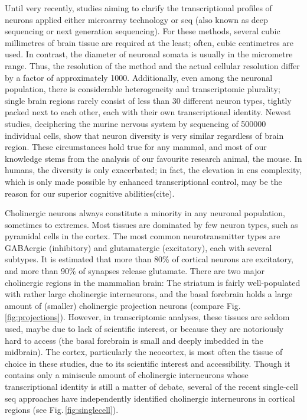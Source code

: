 Until very recently, studies aiming to clarify the transcriptional profiles of neurons applied either microarray technology or \ac{seq} (also known as deep sequencing or next generation sequencing). For these methods, several cubic millimetres of brain tissue are required at the least; often, cubic centimetres are used. In contrast, the diameter of neuronal somata is usually in the micrometre range. Thus, the resolution of the method and the actual cellular resolution differ by a factor of approximately \num{1000}. Additionally, even among the neuronal population, there is considerable heterogeneity and transcriptomic plurality; single brain regions rarely consist of less than 30 different neuron types, tightly packed next to each other, each with their own transcriptional identity.\cite{Darmanis2015, Zeisel2015, Tasic2016, Habib2016} Newest studies, deciphering the murine nervous system by sequencing of \num{500000} individual cells, show that neuron diversity is very similar regardless of brain region.\cite{Zeisel2018} These circumstances hold true for any mammal, and most of our knowledge stems from the analysis of our favourite research animal, the mouse. In humans, the diversity is only exacerbated; in fact, the elevation in \ac{cns} complexity, which is only made possible by enhanced transcriptional control, may be the reason for our superior cognitive abilities(cite).

Cholinergic neurons always constitute a minority in any neuronal population, sometimes to extremes. Most tissues are dominated by few neuron types, such as pyramidal cells in the cortex. The most common neurotransmitter types are GABAergic (inhibitory) and glutamatergic (excitatory), each with several subtypes. It is estimated that more than 80\% of cortical neurons are excitatory, and more than 90\% of synapses release glutamate.\cite{Raichle2002} There are two major cholinergic regions in the mammalian brain: The striatum is fairly well-populated with rather large cholinergic interneurons, and the basal forebrain holds a large amount of (smaller) cholinergic projection neurons (compare Fig.\,\ref{fig:projections}). However, in transcriptomic analyses, these tissues are seldom used, maybe due to lack of scientific interest, or because they are notoriously hard to access (the basal forebrain is small and deeply imbedded in the midbrain). The cortex, particularly the neocortex, is most often the tissue of choice in these studies, due to its scientific interest and accessibility. Though it contains only a miniscule amount of cholinergic interneurons whose transcriptional identity is still a matter of debate, several of the recent single-cell \ac{seq} approaches have independently identified cholinergic interneurons in cortical regions (see Fig.\,\ref{fig:singlecell}).

